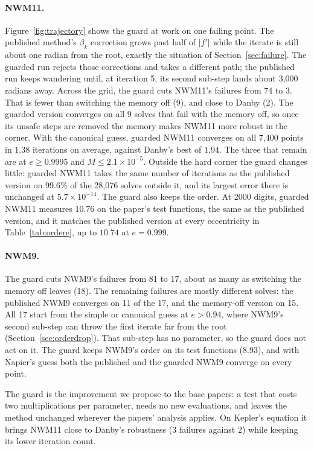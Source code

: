 \documentclass[sigconf,nonacm]{acmart}
\begin{document}
\paragraph{NWM11.} Figure~\ref{fig:trajectory} shows the guard at work on
one failing point. The published method's $\beta_k$ correction grows past
half of $|f'|$ while the iterate is still about one radian from the root,
exactly the situation of Section~\ref{sec:failure}. The guarded run
rejects those corrections and takes a different path; the published run
keeps wandering until, at iteration 5, its second sub-step lands about
3{,}000 radians away. Across the grid, the guard cuts NWM11's
failures from 74 to 3. That is
fewer than switching the memory off (9), and close to Danby (2). The
guarded version converges on all 9 solves that fail with the memory off,
so once its unsafe steps are removed the memory makes NWM11 more robust
in the corner. With the
canonical guess, guarded NWM11 converges on all 7{,}400 points in $1.38$
iterations on average, against Danby's best of $1.94$. The three
that remain are at $e \ge 0.9995$ and $M \le 2.1\times10^{-5}$. Outside
the hard corner the guard changes little: guarded NWM11 takes the same
number of iterations as the published version on 99.6\% of the 28{,}076
solves outside it, and its largest error there is unchanged at
$5.7\times10^{-14}$. The guard also
keeps the order. At 2000 digits, guarded NWM11 measures $10.76$ on
the paper's test functions, the same as the published version, and it
matches the published version at every eccentricity in
Table~\ref{tab:ordere}, up to $10.74$ at $e = 0.999$.

\paragraph{NWM9.} The guard cuts NWM9's failures from 81 to 17, about as
many as switching the memory off leaves (18). The remaining failures are
mostly different solves: the published NWM9 converges on 11 of the 17,
and the memory-off version on 15. All 17 start from the simple or canonical guess at $e > 0.94$,
where NWM9's second sub-step can throw the first iterate far from the root
(Section~\ref{sec:orderdrop}). That sub-step has no parameter, so the
guard does not act on it. The guard keeps NWM9's order on its test
functions ($8.93$), and with Napier's guess both the published and the
guarded NWM9 converge on every point.

The guard is the improvement we propose to the base papers: a test that
costs two multiplications per parameter, needs no new evaluations, and
leaves the method unchanged wherever the papers' analysis applies. On
Kepler's equation it brings NWM11 close to Danby's robustness (3 failures
against 2) while keeping its lower iteration count.
\end{document}
